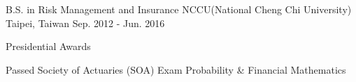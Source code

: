 

\begin{cventries}

  \cventry
    {B.S. in Risk Management and Insurance} %
    {NCCU(National Cheng Chi University)} %
    {Taipei, Taiwan} %
    {Sep. 2012 - Jun. 2016} %
    {
      \begin{cvitems} %
        \item {Presidential Awards}
        \item {Passed Society of Actuaries (SOA) Exam Probability \& Financial Mathematics}
      \end{cvitems}
    }

\end{cventries}
